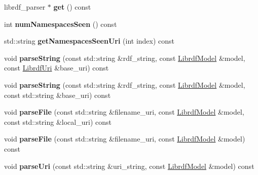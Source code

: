 \begin{DoxyCompactItemize}
\mbox{\label{classredland_1_1LibrdfParser_aadb297b986879ca618d3092fe737d41c}} 
librdf\+\_\+parser $\ast$ {\bfseries get} () const
\item 
\mbox{\label{classredland_1_1LibrdfParser_a1e2098e2c99ba886ab1521048258600c}} 
int {\bfseries num\+Namespaces\+Seen} () const
\item 
\mbox{\label{classredland_1_1LibrdfParser_aed92021f88bccfa26bf78c29797b4208}} 
std\+::string {\bfseries get\+Namespaces\+Seen\+Uri} (int index) const
\item 
\mbox{\label{classredland_1_1LibrdfParser_a86739506ba32a9a6da8b69711f1026db}} 
void {\bfseries parse\+String} (const std\+::string \&rdf\+\_\+string, const \hyperlink{classredland_1_1LibrdfModel}{Librdf\+Model} \&model, const \hyperlink{classredland_1_1LibrdfUri}{Librdf\+Uri} \&base\+\_\+uri) const
\item 
\mbox{\label{classredland_1_1LibrdfParser_a2a7ac5ac97b4bc5876db02f0b9c7b987}} 
void {\bfseries parse\+String} (const std\+::string \&rdf\+\_\+string, const \hyperlink{classredland_1_1LibrdfModel}{Librdf\+Model} \&model, const std\+::string \&base\+\_\+uri) const
\item 
\mbox{\label{classredland_1_1LibrdfParser_a14c24e47699166e3b5bd4141ebd946ff}} 
void {\bfseries parse\+File} (const std\+::string \&filename\+\_\+uri, const \hyperlink{classredland_1_1LibrdfModel}{Librdf\+Model} \&model, const std\+::string \&local\+\_\+uri) const
\item 
\mbox{\label{classredland_1_1LibrdfParser_a15ffb21bf48e486708eab820719827a6}} 
void {\bfseries parse\+File} (const std\+::string \&filename\+\_\+uri, const \hyperlink{classredland_1_1LibrdfModel}{Librdf\+Model} \&model) const
\item 
\mbox{\label{classredland_1_1LibrdfParser_a733bf5d33a2d71bd6d7c201e1c952b04}} 
void {\bfseries parse\+Uri} (const std\+::string \&uri\+\_\+string, const \hyperlink{classredland_1_1LibrdfModel}{Librdf\+Model} \&model) const

\end{DoxyCompactItemize}
